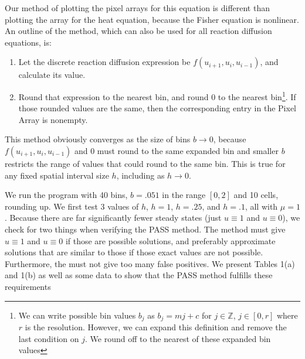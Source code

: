 \documentclass{article}
\begin{document}
Our method of plotting the pixel arrays for this equation is different than plotting the array for the heat equation, because the Fisher equation is nonlinear. An outline of the method, which can also be used for all reaction diffusion equations, is:

\begin{enumerate}
    \item Let the discrete reaction diffusion expression be $f(u_{i+1}, u_i, u_{i-1})$, and calculate its value.
    \item  Round that expression to the nearest bin, and round 0 to the nearest bin\footnote{We can write possible bin values $b_j$ as $b_j = mj + c$ for $j \in \mathbb{Z}$, $j \in [0,r]$ where $r$ is the resolution. However, we can expand this definition and remove the last condition on $j$. We round off to the nearest of these expanded bin values}. If those rounded values are the same, then the corresponding entry in the Pixel Array is nonempty.
\end{enumerate}

This method obviously converges as the size of bins $b \rightarrow 0$, because $f(u_{i+1}, u_i, u_{i-1})$ and 0 must round to the same expanded bin and smaller $b$ restricts the range of values that could round to the same bin. This is true for any fixed spatial interval size $h$, including as $h \rightarrow 0$.

We run the program with 40 bins, $b = .051$ in the range $[0,2]$ and 10 cells, rounding up. We first test 3 values of $h$, $h = 1$, $h = .25$, and $h = .1$, all with $\mu = 1$. Because there are far significantly fewer steady states (just $u \equiv 1$ and $u \equiv 0$), we check for two things when verifying the PASS method. The method must give $u \equiv 1$ and $u \equiv 0$ if those are possible solutions, and preferably approximate solutions that are similar to those if those exact values are not possible. Furthermore, the must not give too many false positives. We present Tables 1(a) and 1(b) as well as some data to show that the PASS method fulfills these requirements

\begin{comment}
\footnote{Ok, does it?}.
\end{comment}
\end{document}
